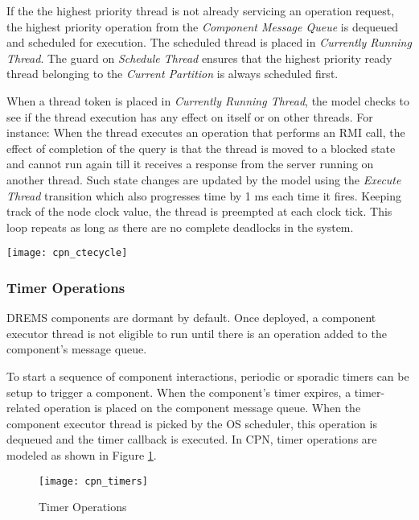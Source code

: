 If the the highest priority thread is not already servicing an operation request, the highest priority operation from the \emph{Component Message Queue} is dequeued and scheduled for execution. The scheduled thread is placed in \emph{Currently Running Thread}. The guard on \emph{Schedule Thread} ensures that the highest priority ready thread belonging to the \emph{Current Partition} is always scheduled first. 

When a thread token is placed in \emph{Currently Running Thread}, the model checks to see if the thread execution has any effect on itself or on other threads. For instance: When the thread executes an operation that performs an RMI call, the effect of completion of the query is that the thread is moved to a blocked state and cannot run again till it receives a response from the server running on another thread. Such state changes are updated by the model using the \emph{Execute Thread} transition which also progresses time by 1 ms each time it fires. Keeping track of the node clock value, the thread is preempted at each clock tick. This loop repeats as long as there are no complete deadlocks in the system. 

\begin{figure*}
\centering
\texttt{[image: cpn\_ctecycle]}
\caption{Component Thread Execution Cycle}
\label{fig:cpn_ctecycle}
\vspace{-0.2in}
\end{figure*}

\subsubsection{Timer Operations}
\label{sec:Timer_Operations}

DREMS components are dormant by default. Once deployed, a component executor thread is not eligible to run until there is an operation added to the component's message queue. 

To start a sequence of component interactions, periodic or sporadic timers can be setup to trigger a component. When the component's timer expires, a timer-related operation is placed on the component message queue. When the component executor thread is picked by the OS scheduler, this operation is dequeued and the timer callback is executed. In CPN, timer operations are modeled as shown in Figure \ref{fig:cpn_timers}. 

\begin{figure}[ht]
\centering
\vspace{-0.1in}
\texttt{[image: cpn\_timers]}
\caption{Timer Operations}
\label{fig:cpn_timers}
\vspace{-0.17in}
\end{figure}

